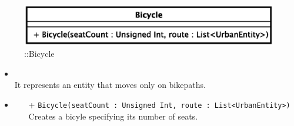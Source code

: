\begin{figure}[h]
\centering
\includegraphics[scale=0.6,keepaspectratio]{images/solution/bicycle.eps}
\caption{\pActive::Bicycle}
\label{fig:sd-app-bicycle}
\end{figure}
\FloatBarrier
\begin{itemize}
  \item \textbf{\descr} \\
It represents an entity that moves only on bikepaths.
  \item \textbf{\ops}
  \begin{itemize}
  \item[+] \texttt{Bicycle(seatCount : Unsigned Int, route : List<UrbanEntity>)} \\
Creates a bicyle specifying its number of seats.
  \end{itemize}
\end{itemize} 
